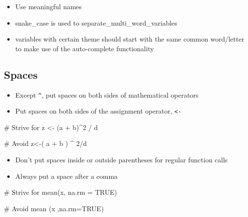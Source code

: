 \documentclass[
  letterpaper,
  DIV=11,
  numbers=noendperiod]{scrreprt}
\newenvironment{Shaded}{\begin{snugshade}}{\end{snugshade}}
\newcommand{\AttributeTok}[1]{\textcolor[rgb]{0.40,0.45,0.13}{#1}}
\newcommand{\CommentTok}[1]{\textcolor[rgb]{0.37,0.37,0.37}{#1}}
\newcommand{\ConstantTok}[1]{\textcolor[rgb]{0.56,0.35,0.01}{#1}}
\newcommand{\DecValTok}[1]{\textcolor[rgb]{0.68,0.00,0.00}{#1}}
\newcommand{\FunctionTok}[1]{\textcolor[rgb]{0.28,0.35,0.67}{#1}}
\newcommand{\NormalTok}[1]{\textcolor[rgb]{0.00,0.23,0.31}{#1}}
\newcommand{\OtherTok}[1]{\textcolor[rgb]{0.00,0.23,0.31}{#1}}
\newcommand{\SpecialCharTok}[1]{\textcolor[rgb]{0.37,0.37,0.37}{#1}}
\providecommand{\tightlist}{%
  \setlength{\itemsep}{0pt}\setlength{\parskip}{0pt}}\usepackage{longtable,booktabs,array}
\begin{document}
\begin{itemize}
\tightlist
\item
  Use meaningful names
\item
  snake\_case is used to separate\_multi\_word\_variables
\item
  variables with certain theme should start with the same common
  word/letter to make use of the auto-complete functionality
\end{itemize}

\subsection{Spaces}\label{spaces}

\begin{itemize}
\tightlist
\item
  Except \texttt{\^{}}, put spaces on both sides of mathematical
  operators
\item
  Put spaces on both sides of the assignment operator,
  \texttt{\textless{}-}
\end{itemize}

\begin{Shaded}
\begin{Highlighting}[]
\CommentTok{\# Strive for}
\NormalTok{z }\OtherTok{\textless{}{-}}\NormalTok{ (a }\SpecialCharTok{+}\NormalTok{ b)}\SpecialCharTok{\^{}}\DecValTok{2} \SpecialCharTok{/}\NormalTok{ d}

\CommentTok{\# Avoid}
\NormalTok{z}\OtherTok{\textless{}{-}}\NormalTok{( a }\SpecialCharTok{+}\NormalTok{ b ) }\SpecialCharTok{\^{}} \DecValTok{2}\SpecialCharTok{/}\NormalTok{d}
\end{Highlighting}
\end{Shaded}

\begin{itemize}
\tightlist
\item
  Don't put spaces inside or outside parentheses for regular function
  calls
\item
  Always put a space after a comma
\end{itemize}

\begin{Shaded}
\begin{Highlighting}[]
\CommentTok{\# Strive for}
\FunctionTok{mean}\NormalTok{(x, }\AttributeTok{na.rm =} \ConstantTok{TRUE}\NormalTok{)}

\CommentTok{\# Avoid}
\FunctionTok{mean}\NormalTok{ (x ,}\AttributeTok{na.rm=}\ConstantTok{TRUE}\NormalTok{)}
\end{Highlighting}
\end{Shaded}
\end{document}
